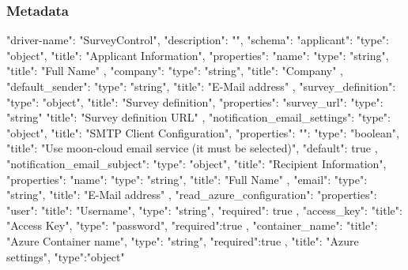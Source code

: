 \documentclass[../main.tex]{subfiles}
\begin{document}
\subsubsection{Metadata}
\begin{js}
{
	"driver-name": "SurveyControl",
	"description": "",
	"schema": {
		"applicant": {
			"type": "object",
			"title": "Applicant Information",
			"properties": {
				"name": {
					"type": "string",
					"title": "Full Name"
				},
				"company": {
					"type": "string",
					"title": "Company"
				},
				"default_sender": {
					"type": "string",
					"title": "E-Mail address"
				}
			}
		},
        "survey_definition": {
            "type": "object",
            "title": "Survey definition",
            "properties": {
                "survey_url": {
                    "type": "string"
                    "title": "Survey definition URL"
                }
            }
        },
        "notification_email_settings": {
			"type": "object",
			"title": "SMTP Client Configuration",
			"properties": {
				"": {
					"type": "boolean",
					"title": "Use moon-cloud email service (it must be selected)",
					"default": true
				}
			}
		},
		"notification_email_subject": {
			"type": "object",
			"title": "Recipient Information",
			"properties": {
				"name": {
					"type": "string",
					"title": "Full Name"
				},
				"email": {
					"type": "string",
					"title": "E-Mail address"
				}
			}
		},
        "read_azure_configuration":{
            "properties": {
                "user": {
                    "title": "Username",
                    "type": "string",
                    "required": true
                },
                "access_key": {
                    "title": "Access Key",
                    "type": "password",
                    "required":true
                },
                "container_name": {
                    "title": "Azure Container name",
                    "type": "string",
                    "required":true
                }
            },
            "title": "Azure settings",
            "type":"object"
        }
	}
}


\end{js}
\end{document}

